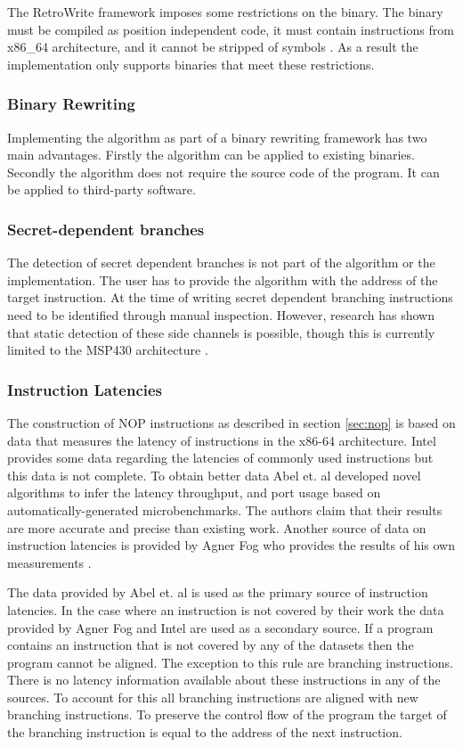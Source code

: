 The RetroWrite framework imposes some restrictions on the binary. The binary must be compiled as position independent code, it must contain instructions from x86\_64 architecture, and 
it cannot be stripped of symbols \cite{hexhive}. 
As a result the implementation only supports binaries that meet these restrictions. 

\subsubsection{Binary Rewriting}
Implementing the algorithm as part of a binary rewriting framework has two main advantages. 
Firstly the algorithm can be applied to existing binaries. 
Secondly the algorithm does not require the source code of the program. It can be applied to third-party software. 


\subsubsection{Secret-dependent branches}
The detection of secret dependent branches is not part of the algorithm or the implementation. The user has to provide the algorithm with the address of the target instruction. 
At the time of writing secret dependent branching instructions need to be identified through manual inspection. However, research has shown that static detection of these side channels is possible, though 
this is currently limited to the MSP430 architecture \cite{MSP430Detection}.

\subsubsection{Instruction Latencies}
The construction of NOP instructions as described in section \ref{sec:nop} is based on data that measures the latency of instructions in the x86-64 architecture.
Intel provides some data regarding the latencies of commonly used instructions \cite{intel-ref-manual} but this data is not complete.
To obtain better data Abel et. al  \cite{uops} developed novel algorithms to infer the latency throughput, and port usage based on automatically-generated microbenchmarks. 
The authors claim that their results are more accurate and precise than existing work. 
Another source of data on instruction latencies is provided by Agner Fog who provides the results of his own measurements \cite{fog_2021}. 

The data provided by Abel et. al is  used as the primary source of instruction latencies. In the case where an instruction is not covered by their work the data 
provided by Agner Fog and Intel are used as a secondary source. If a program contains an instruction that is not covered by any of the datasets then the program cannot
be aligned. The exception to this rule are branching instructions. There is no latency information available about these instructions in any of the sources. 
To account for this  all branching instructions are aligned with new branching instructions. To preserve the control flow of the program the target of 
the branching instruction is equal to the address of the next instruction. 
